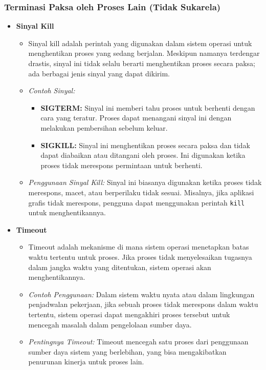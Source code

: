 \documentclass[12pt]{article}
\begin{document}
\begin{itemize}
    \subsubsection{Terminasi Paksa oleh Proses Lain (Tidak Sukarela)}
    \begin{itemize}
        \item \textbf{Sinyal Kill}
        \begin{itemize}
            \item Sinyal kill adalah perintah yang digunakan dalam sistem operasi untuk menghentikan proses yang sedang berjalan. Meskipun namanya terdengar drastis, sinyal ini tidak selalu berarti menghentikan proses secara paksa; ada berbagai jenis sinyal yang dapat dikirim.
            \item \textit{Contoh Sinyal:}
            \begin{itemize}
                \item \textbf{SIGTERM:} Sinyal ini memberi tahu proses untuk berhenti dengan cara yang teratur. Proses dapat menangani sinyal ini dengan melakukan pembersihan sebelum keluar.
                \item \textbf{SIGKILL:} Sinyal ini menghentikan proses secara paksa dan tidak dapat diabaikan atau ditangani oleh proses. Ini digunakan ketika proses tidak merespons permintaan untuk berhenti.
            \end{itemize}
            \item \textit{Penggunaan Sinyal Kill:}  
            Sinyal ini biasanya digunakan ketika proses tidak merespons, macet, atau berperilaku tidak sesuai. Misalnya, jika aplikasi grafis tidak merespons, pengguna dapat menggunakan perintah \texttt{kill} untuk menghentikannya.
        \end{itemize}
        \item \textbf{Timeout}
        \begin{itemize}
            \item Timeout adalah mekanisme di mana sistem operasi menetapkan batas waktu tertentu untuk proses. Jika proses tidak menyelesaikan tugasnya dalam jangka waktu yang ditentukan, sistem operasi akan menghentikannya.
            \item \textit{Contoh Penggunaan:}  
            Dalam sistem waktu nyata atau dalam lingkungan penjadwalan pekerjaan, jika sebuah proses tidak merespons dalam waktu tertentu, sistem operasi dapat mengakhiri proses tersebut untuk mencegah masalah dalam pengelolaan sumber daya.
            \item \textit{Pentingnya Timeout:}  
            Timeout mencegah satu proses dari penggunaan sumber daya sistem yang berlebihan, yang bisa mengakibatkan penurunan kinerja untuk proses lain.
        \end{itemize}
    \end{itemize}


\end{itemize}
\end{document}
